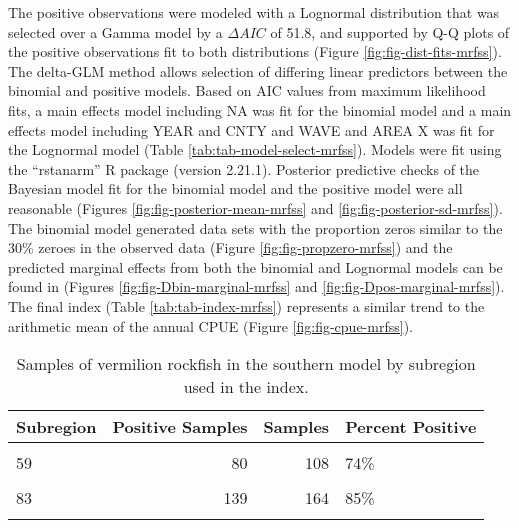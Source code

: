 \documentclass[
]{article}
\begin{document}
The positive observations were modeled with a Lognormal distribution
that was selected over a Gamma model
by a \(\Delta AIC\) of 51.8, and supported by Q-Q plots of the positive observations fit to both distributions (Figure \ref{fig:fig-dist-fits-mrfss}). The delta-GLM
method allows selection of differing linear predictors between the binomial and positive models. Based on AIC values from maximum likelihood fits,
a main effects model including
NA
was fit for the binomial model and a main effects model including
YEAR and CNTY and WAVE and AREA X
was fit for the Lognormal model (Table \ref{tab:tab-model-select-mrfss}).
Models were fit using the ``rstanarm'' R package (version 2.21.1). Posterior predictive
checks of the Bayesian model fit for the binomial model and the positive model
were all reasonable (Figures \ref{fig:fig-posterior-mean-mrfss} and
\ref{fig:fig-posterior-sd-mrfss}). The binomial model generated data sets with the
proportion zeros similar to the
30\%
zeroes in the observed data (Figure \ref{fig:fig-propzero-mrfss}) and the
predicted marginal effects from both the binomial and Lognormal models
can be found in (Figures \ref{fig:fig-Dbin-marginal-mrfss} and
\ref{fig:fig-Dpos-marginal-mrfss}). The final index (Table \ref{tab:tab-index-mrfss})
represents a similar trend to the arithmetic mean of the annual CPUE (Figure \ref{fig:fig-cpue-mrfss}).

\newpage

\begin{table}

\caption{\label{tab:tab-region-mrfss}Samples of vermilion rockfish in the southern model by subregion used in the index.}
\centering
\begin{tabular}[t]{lrrl}
\toprule
Subregion & Positive Samples & Samples & Percent Positive\\
\midrule
\cellcolor{gray!6}{37} & \cellcolor{gray!6}{163} & \cellcolor{gray!6}{242} & \cellcolor{gray!6}{67\%}\\
59 & 80 & 108 & 74\%\\
\cellcolor{gray!6}{73} & \cellcolor{gray!6}{131} & \cellcolor{gray!6}{209} & \cellcolor{gray!6}{63\%}\\
83 & 139 & 164 & 85\%\\
\cellcolor{gray!6}{111} & \cellcolor{gray!6}{217} & \cellcolor{gray!6}{320} & \cellcolor{gray!6}{68\%}\\
\bottomrule
\end{tabular}
\end{table}
\end{document}
